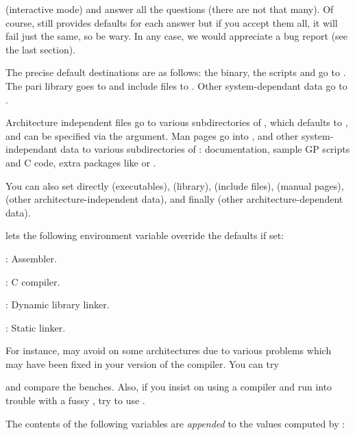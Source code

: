 
\noindent (interactive mode) and answer all the questions (there are not that
many). Of course,  still provides defaults for each answer
but if you accept them all, it will fail just the same, so be wary. In any
case, we would appreciate a bug report (see the last section).

 The precise default destinations are as
follows: the  binary, the scripts  and  go
to . The pari library goes to  and
include files to . Other system-dependant data go
to .

Architecture independent files go to various subdirectories of
, which defaults to , and can be
specified via the  argument. Man pages go into
, and other system-independant data
to various subdirectories of : documentation,
sample GP scripts and C code, extra packages like  or
.

\noindent You can also set directly  (executables),
 (library),  (include files), 
(manual pages),  (other architecture-independent data), and
finally  (other architecture-dependent data).

  lets the following environment
variable override the defaults if set:

: Assembler.

: C compiler.

: Dynamic library linker.

: Static linker.

\noindent For instance,  may avoid  on some
architectures due to various problems which may have been fixed in your
version of the compiler. You can try


\noindent and compare the benches. Also, if you insist on using a 
compiler and run into trouble with a fussy , try to use
.


\noindent The contents of the following variables are \emph{appended} to the
values computed by :


